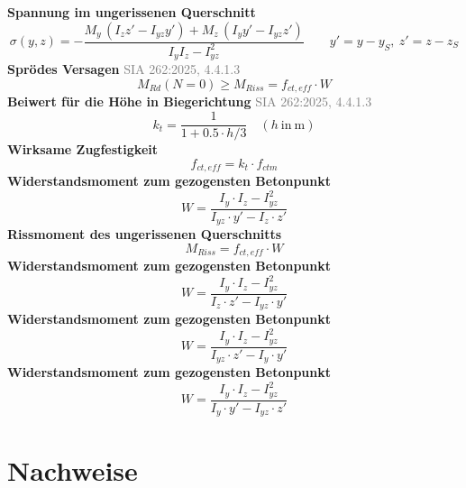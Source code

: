 \documentclass[11pt,a4paper]{article}
\newcommand{\normref}[1]{{\small\textcolor{gray}{#1}}}
\begin{document}
\noindent\textbf{Spannung im ungerissenen Querschnitt}
\begin{equation*}
\sigma(y, z) = -\frac{M_y\,(I_z z' - I_{yz} y') + M_z\,(I_y y' - I_{yz} z')}{I_y I_z - I_{yz}^2}\qquad y' = y - y_S,\ z' = z - z_S
\end{equation*}
\noindent\textbf{Sprödes Versagen} \hfill \normref{SIA 262:2025, 4.4.1.3}
\begin{equation*}
M_{Rd}(N = 0) \ge M_{Riss} = f_{ct,eff} \cdot W
\end{equation*}
\noindent\textbf{Beiwert für die Höhe in Biegerichtung} \hfill \normref{SIA 262:2025, 4.4.1.3}
\begin{equation*}
k_t = \frac{1}{1 + 0.5 \cdot h/3} \quad \left(h\ \text{in}\ \mathrm{m}\right)
\end{equation*}
\noindent\textbf{Wirksame Zugfestigkeit}
\begin{equation*}
f_{ct,eff} = k_t \cdot f_{ctm}
\end{equation*}
\noindent\textbf{Widerstandsmoment zum gezogensten Betonpunkt}
\begin{equation*}
W = \frac{I_y \cdot I_z - I_{yz}^{2}}{I_{yz} \cdot y' - I_z \cdot z'}
\end{equation*}
\noindent\textbf{Rissmoment des ungerissenen Querschnitts}
\begin{equation*}
M_{Riss} = f_{ct,eff} \cdot W
\end{equation*}
\noindent\textbf{Widerstandsmoment zum gezogensten Betonpunkt}
\begin{equation*}
W = \frac{I_y \cdot I_z - I_{yz}^{2}}{I_z \cdot z' - I_{yz} \cdot y'}
\end{equation*}
\noindent\textbf{Widerstandsmoment zum gezogensten Betonpunkt}
\begin{equation*}
W = \frac{I_y \cdot I_z - I_{yz}^{2}}{I_{yz} \cdot z' - I_y \cdot y'}
\end{equation*}
\noindent\textbf{Widerstandsmoment zum gezogensten Betonpunkt}
\begin{equation*}
W = \frac{I_y \cdot I_z - I_{yz}^{2}}{I_y \cdot y' - I_{yz} \cdot z'}
\end{equation*}
\section{Nachweise}
\end{document}
